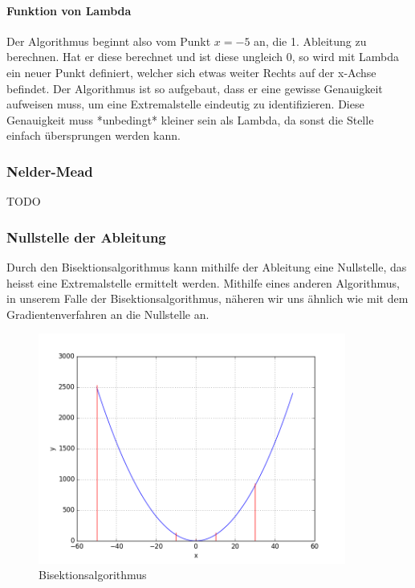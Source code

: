 \documentclass[10pt]{article}         %
\begin{document}
\paragraph{Funktion von Lambda}
Der Algorithmus beginnt also vom Punkt $x=-5$ an, die 1. Ableitung zu berechnen. Hat er diese berechnet und ist diese ungleich 0, so wird mit Lambda ein neuer Punkt definiert, welcher sich etwas weiter Rechts auf der x-Achse befindet. Der Algorithmus ist so aufgebaut, dass er eine gewisse Genauigkeit aufweisen muss, um eine Extremalstelle eindeutig zu identifizieren. Diese Genauigkeit muss *unbedingt* kleiner sein als Lambda, da sonst die Stelle einfach übersprungen werden kann.

\subsubsection{Nelder-Mead}
TODO


\subsubsection{Nullstelle der Ableitung}
Durch den Bisektionsalgorithmus kann mithilfe der Ableitung eine Nullstelle, das heisst eine Extremalstelle ermittelt werden. Mithilfe eines anderen Algorithmus, in unserem Falle der Bisektionsalgorithmus, näheren wir uns ähnlich wie mit dem Gradientenverfahren an die Nullstelle an. 

\begin{figure}[!ht]
    \centering
    \includegraphics[width=0.9\textwidth]{bisektion}
    \caption{Bisektionsalgorithmus}\label{bisektion}
\end{figure}
\end{document}

